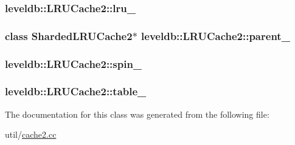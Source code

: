 \subsubsection[{lru\+\_\+}]{ leveldb\+::\+L\+R\+U\+Cache2\+::lru\+\_\+\hspace{0.3cm}{\ttfamily [private]}}\label{classleveldb_1_1_l_r_u_cache2_a8261a306e1fd29074acd21f9af948625}
\hypertarget{classleveldb_1_1_l_r_u_cache2_a5a8c46cff60d4581f3c284a8bd89487a}{}
\subsubsection[{parent\+\_\+}]{\setlength{\rightskip}{0pt plus 5cm}class {\bf Sharded\+L\+R\+U\+Cache2}$\ast$ leveldb\+::\+L\+R\+U\+Cache2\+::parent\+\_\+\hspace{0.3cm}{\ttfamily [private]}}\label{classleveldb_1_1_l_r_u_cache2_a5a8c46cff60d4581f3c284a8bd89487a}
\hypertarget{classleveldb_1_1_l_r_u_cache2_abba88f9b02864ce6c35674a913aa14a5}{}
\subsubsection[{spin\+\_\+}]{ leveldb\+::\+L\+R\+U\+Cache2\+::spin\+\_\+\hspace{0.3cm}{\ttfamily [private]}}\label{classleveldb_1_1_l_r_u_cache2_abba88f9b02864ce6c35674a913aa14a5}
\hypertarget{classleveldb_1_1_l_r_u_cache2_aae26c86eb96a41eba33cb80de0520c93}{}
\subsubsection[{table\+\_\+}]{ leveldb\+::\+L\+R\+U\+Cache2\+::table\+\_\+\hspace{0.3cm}{\ttfamily [private]}}\label{classleveldb_1_1_l_r_u_cache2_aae26c86eb96a41eba33cb80de0520c93}


The documentation for this class was generated from the following file\+:\begin{DoxyCompactItemize}
\item 
util/\hyperlink{cache2_8cc}{cache2.\+cc}\end{DoxyCompactItemize}

